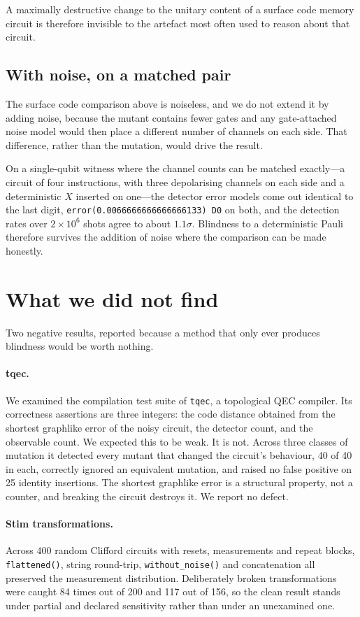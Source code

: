 \documentclass[twocolumn,10pt]{article}
\begin{document}
A maximally destructive change to the unitary content of a surface code memory
circuit is therefore invisible to the artefact most often used to reason about
that circuit.

\subsection{With noise, on a matched pair}

The surface code comparison above is noiseless, and we do not extend it by
adding noise, because the mutant contains fewer gates and any gate-attached
noise model would then place a different number of channels on each side. That
difference, rather than the mutation, would drive the result.

On a single-qubit witness where the channel counts can be matched exactly---a
circuit of four instructions, with three depolarising channels on each side and
a deterministic $X$ inserted on one---the detector error models come out
identical to the last digit, \texttt{error(0.0066666666666666133) D0} on both,
and the detection rates over $2\times10^6$ shots agree to about $1.1\sigma$.
Blindness to a deterministic Pauli therefore survives the addition of noise
where the comparison can be made honestly.

\section{What we did not find}

Two negative results, reported because a method that only ever produces
blindness would be worth nothing.

\paragraph{tqec.} We examined the compilation test suite of \texttt{tqec}, a
topological QEC compiler. Its correctness assertions are three integers: the
code distance obtained from the shortest graphlike error of the noisy circuit,
the detector count, and the observable count. We expected this to be weak. It is
not. Across three classes of mutation it detected every mutant that changed the
circuit's behaviour, 40 of 40 in each, correctly ignored an equivalent mutation,
and raised no false positive on 25 identity insertions. The shortest graphlike
error is a structural property, not a counter, and breaking the circuit destroys
it. We report no defect.

\paragraph{Stim transformations.} Across 400 random Clifford circuits with
resets, measurements and repeat blocks, \texttt{flattened()}, string round-trip,
\texttt{without\_noise()} and concatenation all preserved the measurement
distribution. Deliberately broken transformations were caught 84 times out of
200 and 117 out of 156, so the clean result stands under partial and declared
sensitivity rather than under an unexamined one.
\end{document}
